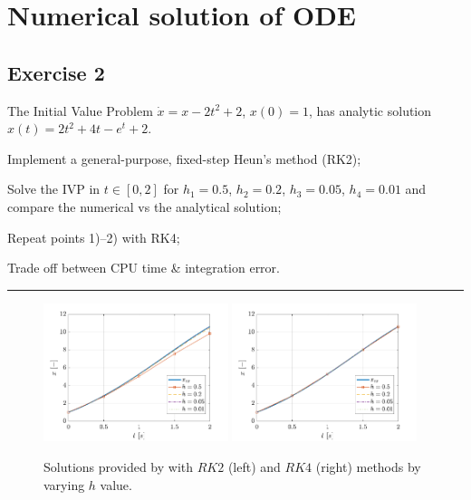 \documentclass[11pt,a4paper,oneside]{article}
\begin{document}
\clearpage


\section{Numerical solution of ODE}
\subsection*{Exercise 2}

The Initial Value Problem $\dot x = x- 2t^2+2$, $x(0) = 1$, has analytic solution $x(t) = 2t^2 + 4t - e^t + 2$. 
\begin{enumerate*}[label=\arabic*)]
    \item Implement a general-purpose, fixed-step Heun's method (RK2);
    \item Solve the IVP in $t\in[0,2]$ for $h_1 = 0.5$, $h_2 = 0.2$, $h_3 = 0.05$, $h_4 = 0.01$ and compare the numerical vs the analytical solution;
    \item Repeat points 1)--2) with RK4;
    \item Trade off between CPU time \& integration error.
\end{enumerate*}

\medskip \hrule \medskip

\begin{figure}[ht]
    \centering
    \includegraphics[width = 0.48\textwidth]{gfx/ex2_1.pdf}
    \includegraphics[width = 0.48\textwidth]{gfx/ex2_2.pdf}
    \caption{Solutions provided by with $RK2$ (left) and $RK4$ (right) methods by varying $h$ value.}
    \label{fig:ex2_sol}
\end{figure}
\end{document}
